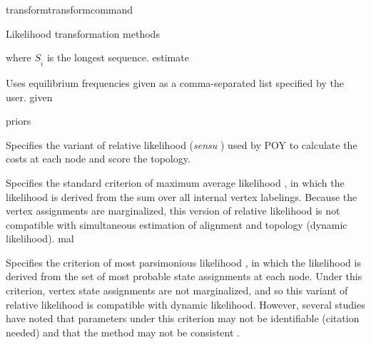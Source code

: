 \begin{command}{transform}{transformcommand}
\begin{arguments}
\begin{argumentgroup}{Likelihood transformation methods}
{\begin{description}
{                             where
                            $S_{\hat{i}}$ is the longest sequence.}
                            {estimate}

                            {Uses equilibrium frequencies given as a
                            comma-separated list specified by the user.}
                            {given}

                    \end{description}}
                {priors}

                    {Specifies the variant of relative likelihood (\textit{sensu}
                    \cite{steel2000parsimony}) used by POY to calculate the costs at
                    each node and score the topology.

                    \begin{description}

                            {Specifies the standard criterion of maximum average
                            likelihood \cite{felsenstein1981}, in which the
                            likelihood is derived from the sum over all internal
                            vertex labelings. Because the vertex assignments are
                            marginalized, this version of relative likelihood is not
                            compatible with simultaneous estimation of alignment and
                            topology (dynamic likelihood).}
                            {mal}

                            {Specifies the criterion of most parsimonious likelihood
                            \cite{barryandhartigan1987}, in which the likelihood is
                            derived from the set of most probable state assignments
                            at each node. Under this criterion, vertex state
                            assignments are not marginalized, and so this variant of
                            relative likelihood is compatible with dynamic
                            likelihood. However, several studies have noted that
                            parameters under this criterion may not be identifiable
                            (citation needed) and that the method may not be consistent
                            \cite[for example]{mossel2009shrinkage}.
                            
}
\end{description}}
\end{argumentgroup}
\end{arguments}
\end{command}
